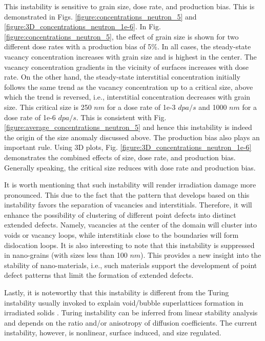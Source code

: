 \documentclass[utf8]{frontiersSCNS} %
\begin{document}
    This instability is sensitive to grain size, dose rate, and production bias. This is demonstrated in Figs. \ref{figure:concentrations_neutron_5} and \ref{figure:3D_concentrations_neutron_1e-6}. In Fig. \ref{figure:concentrations_neutron_5}, the effect of grain size is shown for two different dose rates with a production bias of 5\%. In all cases, the steady-state vacancy concentration increases with grain size and is highest in the center. The vacancy concentration gradients in the vicinity of surfaces increases with dose rate. On the other hand, the steady-state interstitial concentration initially follows the same trend as the vacancy concentration up to a critical size, above which the trend is reversed, i.e., interstitial concentration decreases with grain size. This critical size is 250 $nm$ for a dose rate of 1e-3 $dpa/s$ and 1000 $nm$ for a dose rate of 1e-6 $dpa/s$. This is consistent with Fig. \ref{figure:average_concentrations_neutron_5} and hence this instability is indeed the origin of the size anomaly discussed above. The production bias also plays an important rule. Using 3D plots, Fig. \ref{figure:3D_concentrations_neutron_1e-6} demonstrates the combined effects of size, dose rate, and production bias. Generally speaking, the critical size reduces with dose rate and production bias.
    
    It is worth mentioning that such instability will render irradiation damage more pronounced. This due to the fact that the pattern that develops based on this instability favors the separation of vacancies and interstitials. Therefore, it will enhance the possibility of clustering of different point defects into distinct extended defects. Namely, vacancies at the center of the domain will cluster into voids or vacancy loops, while interstitials close to the boundaries will form dislocation loops. It is also interesting to note that this instability is suppressed in nano-grains (with sizes less than 100 $nm$). This provides a new insight into the stability of nano-materials, i.e., such materials support the development of point defect patterns that limit the formation of extended defects.
    
    Lastly, it is noteworthy that this instability is different from the Turing instability usually invoked to explain void/bubble superlattices formation in irradiated solids \citep{noble2020,ghoniem2001,krishnanOct1980,gao2018}. Turing instability can be inferred from linear stability analysis and depends on the ratio and/or anisotropy of diffusion coefficients. The current instability, however, is nonlinear, surface induced, and size regulated.\\
\end{document}
